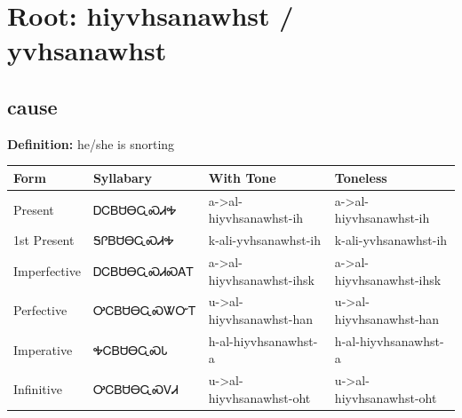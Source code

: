 \documentclass{article}%
\begin{document}
%
\normalsize%
\section*{Root: hiyvhsanawhst / yvhsanawhst}%
\subsection*{cause}%
\textbf{Definition: }%
he/she is snorting%
\\[0.5em]%
\begin{tabular}{|l|l|l|l|}%
\hline%
\textbf{Form}&\textbf{Syllabary}&\textbf{With Tone}&\textbf{Toneless}\\%
\hline%
Present&ᎠᏟᏴᏌᎾᏩᏍᏗᎭ&a{-}>al{-}hiyvhsanawhst{-}ih&a{-}>al{-}hiyvhsanawhst{-}ih\\%
1st Present&ᎦᎵᏴᏌᎾᏩᏍᏗᎭ&k{-}ali{-}yvhsanawhst{-}ih&k{-}ali{-}yvhsanawhst{-}ih\\%
Imperfective&ᎠᏟᏴᏌᎾᏩᏍᏗᏍᎪᎢ&a{-}>al{-}hiyvhsanawhst{-}ihsk&a{-}>al{-}hiyvhsanawhst{-}ihsk\\%
Perfective&ᎤᏟᏴᏌᎾᏩᏍᏔᏅᎢ&u{-}>al{-}hiyvhsanawhst{-}han&u{-}>al{-}hiyvhsanawhst{-}han\\%
Imperative&ᎭᏟᏴᏌᎾᏩᏍᏓ&h{-}al{-}hiyvhsanawhst{-}a&h{-}al{-}hiyvhsanawhst{-}a\\%
Infinitive&ᎤᏟᏴᏌᎾᏩᏍᏙᏗ&u{-}>al{-}hiyvhsanawhst{-}oht&u{-}>al{-}hiyvhsanawhst{-}oht\\%
\hline%
\end{tabular}%
\\[1em]%
\end{document}
